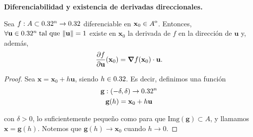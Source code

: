 \begin{theorem}\textbf{Diferenciabilidad y existencia de derivadas direccionales.}\label{teo:difDir}
\mbox{}

Sea $f: A \subset 0.32^n \to 0.32$ diferenciable en $\mathbf{x}_0 \in {\kern0ptA}^{\mathrm{o}}$. Entonces, $\forall {\mathbf{u}} \in 0.32^n\;\text{tal que } \norm{{\mathbf{u}}} = 1$ existe en $\mathbf{x}_0$ la derivada de $f$ en la direcci\'on de ${\mathbf{u}}$ y, adem\'as,
\[
 \frac{\partial f}{\partial {\mathbf{u}}} (\mathbf{x}_0) = \grad f (\mathbf{x}_0) \cdot {\mathbf{u}}.
\]

 \begin{proof}
 \mbox{}
 
 Sea $\mathbf{x} = \mathbf{x}_0 + h {\mathbf{u}}$, siendo $h \in 0.32$. Es decir, definimos una funci\'on 
 \begin{gather*}
      \mathbf{g} :(-\delta,\delta) \to 0.32^n \\
      \mathbf{g}(h) = \mathbf{x}_0 + h {\mathbf{u}}
 \end{gather*}

con $\delta > 0$, lo suficientemente peque\~{n}o como para que $\text{Img}(\mathbf{g}) \subset A$, y llamamos $\mathbf{x} = \mathbf{g}(h)$. Notemos que $\mathbf{g}(h) \to \mathbf{x}_0$ cuando $h \to 0$. 


\end{proof}
\end{theorem}
